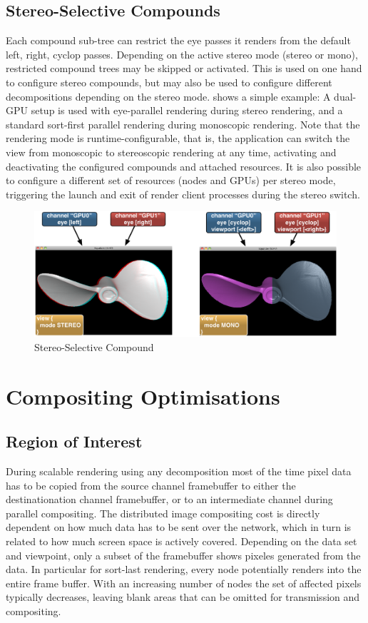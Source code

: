 \section{Stereo-Selective Compounds}

Each compound sub-tree can restrict the eye passes it renders from the default
left, right, cyclop passes. Depending on the active stereo mode (stereo or
mono), restricted compound trees may be skipped or activated. This is used on
one hand to configure stereo compounds, but may also be used to configure
different decompositions depending on the stereo mode.  shows
a simple example: A dual-GPU setup is used with eye-parallel rendering during
stereo rendering, and a standard sort-first parallel rendering during monoscopic
rendering. Note that the rendering mode is runtime-configurable, that is, the
application can switch the view from monoscopic to stereoscopic rendering at any
time, activating and deactivating the configured compounds and attached
resources. It is also possible to configure a different set of resources (nodes
and GPUs) per stereo mode, triggering the launch and exit of render client
processes during the stereo switch.

\begin{figure}[ht]\center
 \includegraphics[width=\columnwidth]{images/stereoSwitch}
 {\caption{\label{fStereoSwitch}Stereo-Selective Compound}}
\end{figure}

\chapter{Compositing Optimisations}

\section{Region of Interest}

During scalable rendering using any decomposition most of the time pixel data
has to be copied from the source channel framebuffer to either the
destinationation channel framebuffer, or to an intermediate channel during
parallel compositing. The distributed image compositing cost is directly
dependent on how much data has to be sent over the network, which in turn is
related to how much screen space is actively covered. Depending on the data set
and viewpoint, only a subset of the framebuffer shows pixeles generated from the
data. In particular for sort-last rendering, every node potentially renders into
the entire frame buffer. With an increasing number of nodes the set of affected
pixels typically decreases, leaving blank areas that can be omitted for
transmission and compositing.

